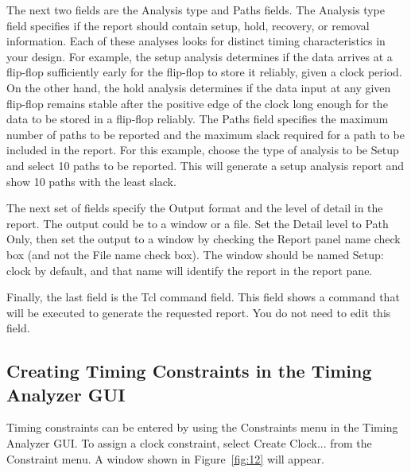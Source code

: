 \documentclass[11pt, twoside, pdftex]{article}
\begin{document}
The next two fields are the {\sf Analysis type} and {\sf Paths} fields. The {\sf Analysis type} 
field specifies if the report should contain setup, hold,
recovery, or removal information. Each of these analyses looks for distinct timing 
characteristics in your design. For example, the setup analysis determines if the data arrives 
at a flip-flop sufficiently early for the flip-flop to store it reliably, given a clock period. 
On the other hand, the hold analysis determines if the data input at any given flip-flop remains 
stable after the positive edge of the clock long enough for the data to be
stored in a flip-flop reliably. The {\sf Paths} field specifies the maximum number of paths to 
be reported and the maximum slack required for a path to be included in the report. For this 
example, choose the type of analysis to be {\sf Setup} and select 10 paths to be reported. This 
will generate a setup analysis report and show 10 paths with the least slack.

The next set of fields specify the {\sf Output} format and the level of detail in the report. 
The output could be to a window or a file. Set the Detail level to {\sf Path Only}, then set 
the output to a window by checking the {\sf Report panel name} check box (and not 
the {\sf File name} check box). The window should be named {\sf Setup: clock} by default,
and that name will identify the report in the report pane.

Finally, the last field is the {\sf Tcl command} field. This field shows a command that will 
be executed to generate the requested report. You do not need to edit this field. 

\subsection{Creating Timing Constraints in the Timing Analyzer GUI}

Timing constraints can be entered by using the {\sf Constraints} menu in the 
Timing Analyzer GUI.  To assign a clock constraint, select {\sf Create Clock...} from the 
{\sf Constraint} menu. A window shown in Figure~\ref{fig:12} will appear.
\end{document}
